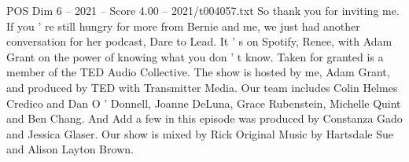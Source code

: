 \begin{textsample}{POS Dim 6 – 2021 – Score 4.00 – 2021/t004057.txt}
So thank you for inviting me.
If you ' re still hungry for more from Bernie and me, we just had another conversation for her podcast, Dare to Lead.
It ' s on Spotify, Renee, with Adam Grant on the power of knowing what you don ' t know.
Taken for granted is a member of the TED Audio Collective.
The show is hosted by me, Adam Grant, and produced by TED with Transmitter Media.
Our team includes Colin Helmes Credico and Dan O ' Donnell, Joanne DeLuna, Grace Rubenstein, Michelle Quint and Ben Chang.
And Add a few in this episode was produced by Constanza Gado and Jessica Glaser.
Our show is mixed by Rick Original Music by Hartsdale Sue and Alison Layton Brown.

\end{textsample}
